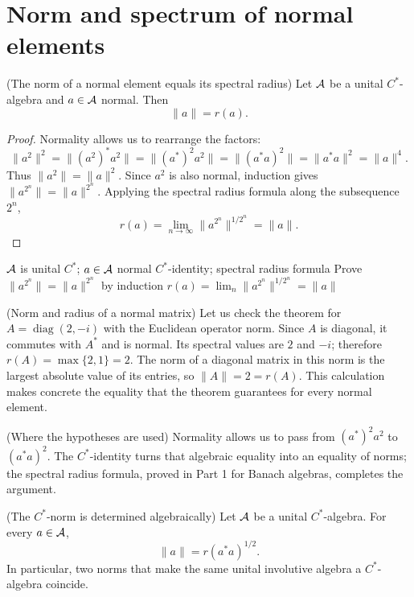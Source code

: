 \pagebreak
\section{Norm and spectrum of normal elements}

\begin{cthteorema}{(The norm of a normal element equals its spectral radius)}
Let $\mathcal A$ be a unital $C^*$-algebra and $a\in\mathcal A$ normal. Then
\[
 \|a\|=r(a).
\]
\end{cthteorema}

\begin{proof}[Proof]
Normality allows us to rearrange the factors:
\[
\|a^2\|^2
=\|(a^2)^*a^2\|
=\|(a^*)^2a^2\|
=\|(a^*a)^2\|
=\|a^*a\|^2
=\|a\|^4.
\]
Thus $\|a^2\|=\|a\|^2$. Since $a^2$ is also normal, induction gives
$\|a^{2^n}\|=\|a\|^{2^n}$. Applying the spectral radius formula along the
subsequence $2^n$,
\[
 r(a)=\lim_{n\to\infty}\|a^{2^n}\|^{1/2^n}=\|a\|.
\]
\end{proof}

\proofdiagram
{$\mathcal A$ is unital $C^*$; $a\in\mathcal A$ normal}
{$C^*$-identity; spectral radius formula}
{Prove $\|a^{2^n}\|=\|a\|^{2^n}$ by induction}
{$r(a)=\lim_n\|a^{2^n}\|^{1/2^n}=\|a\|$}

\begin{cthejemplo}{(Norm and radius of a normal matrix)}
Let us check the theorem for $A=\operatorname{diag}(2,-i)$ with the
Euclidean operator norm. Since $A$ is diagonal, it commutes with
$A^*$ and is normal. Its spectral values are $2$ and $-i$;
therefore $r(A)=\max\{2,1\}=2$. The norm of a diagonal matrix
in this norm is the largest absolute value of its entries, so
$\|A\|=2=r(A)$. This calculation makes concrete the equality that the
theorem guarantees for every normal element.
\end{cthejemplo}

\begin{cthnota}{(Where the hypotheses are used)}
Normality allows us to pass from $(a^*)^2a^2$ to $(a^*a)^2$.
The $C^*$-identity turns that algebraic equality into an equality of norms;
the spectral radius formula, proved in Part 1 for Banach algebras,
completes the argument.
\end{cthnota}


\begin{cthcorolario}{(The $C^*$-norm is determined algebraically)}
Let $\mathcal A$ be a unital $C^*$-algebra. For every $a\in\mathcal A$,
\[
 \|a\|=r(a^*a)^{1/2}.
\]
In particular, two norms that make the same unital involutive algebra a
$C^*$-algebra coincide.
\end{cthcorolario}

